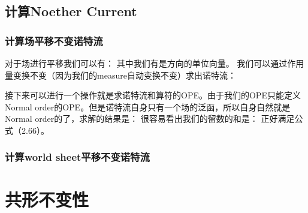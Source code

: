 \subsection{计算Noether Current}
\subsubsection{计算场平移不变诺特流}
对于场进行平移我们可以有：
其中我们有是\seq{\mu}方向的单位向量。
我们可以通过作用量变换不变（因为我们的measure自动变换不变）求出诺特流：

接下来可以进行一个操作就是求诺特流和算符的OPE。由于我们的OPE只能定义Normal order的OPE。但是诺特流自身只有一个场的泛函，所以自身自然就是Normal order的了，求解的结果是：
很容易看出我们的留数的和是：
正好满足公式（2.66）。

\subsubsection{计算world sheet平移不变诺特流}

\newpage
\section{共形不变性}
